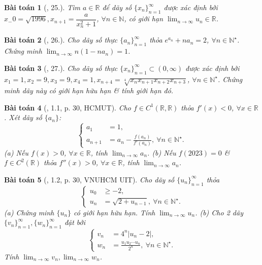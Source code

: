 \documentclass{article}
\newtheorem{baitoan}{Bài toán}
\begin{document}
\begin{baitoan}[\cite{TLCT_dai_so_giai_tich_11}, 25.]
	Tìm $a\in\mathbb{R}$ để dãy số $\{x_n\}_{n=1}^\infty$ được xác định bởi $x_-0 = \sqrt{1996},x_{n+1} = \dfrac{a}{x_n^2 + 1}$, $\forall n\in\mathbb{N}$, có giới hạn $\lim_{n\to\infty} u_n\in\mathbb{R}$.
\end{baitoan}

\begin{baitoan}[\cite{TLCT_dai_so_giai_tich_11}, 26.]
	Cho dãy số thực $\{a_n\}_{n=1}^\infty$ thỏa $e^{a_n} + na_n = 2$, $\forall n\in\mathbb{N}^\star$. Chứng minh $\lim_{n\to\infty} n(1 - na_n) = 1$.
\end{baitoan}

\begin{baitoan}[\cite{TLCT_dai_so_giai_tich_11}, 27.]
	Cho dãy số thực $\{x_n\}_{n=1}^\infty\subset(0,\infty)$ được xác định bởi $x_1 = 1,x_2 = 9,x_3 = 9,x_4 = 1,x_{n+4} = \sqrt[4]{x_nx_{n+1}x_{n+2}x_{n+3}}$, $\forall n\in\mathbb{N}^\star$. Chứng minh dãy này có giới hạn hữu hạn \& tính giới hạn đó.
\end{baitoan}

\begin{baitoan}[\cite{VMS_VMC2023}, 1.1, p. 30, HCMUT]
	Cho $f\in C^1(\mathbb{R},\mathbb{R})$ thỏa $f'(x) < 0$, $\forall x\in\mathbb{R}$. Xét dãy số $\{a_n\}$:
	\begin{equation*}
		\left\{\begin{split}
			a_1 &= 1,\\
			a_{n+1} &= a_n - \frac{f(a_n)}{f'(a_n)},\ \forall n\in\mathbb{N}^\star.
		\end{split}\right.
	\end{equation*}
	(a) Nếu $f(x) > 0$, $\forall x\in\mathbb{R}$, tính $\lim_{n\to\infty} a_n$. (b) Nếu $f(2023) = 0$ \& $f\in C^2(\mathbb{R})$ thỏa $f''(x) > 0$, $\forall x\in\mathbb{R}$, tính $\lim_{n\to\infty} a_n$.
\end{baitoan}

\begin{baitoan}[\cite{VMS_VMC2023}, 1.2, p. 30, VNUHCM UIT]
	Cho dãy số $\{u_n\}_{n=1}^\infty$ thỏa
	\begin{equation*}
		\left\{\begin{split}
			u_0&\ge-2,\\
			u_n &= \sqrt{2 + u_{n-1}},\ \forall n\in\mathbb{N}^\star.
		\end{split}\right.
	\end{equation*}
	(a) Chứng minh $\{u_n\}$ có giới hạn hữu hạn. Tính $\lim_{n\to\infty} u_n$. (b) Cho 2 dãy $\{v_n\}_{n=1}^\infty,\{w_n\}_{n=1}^\infty$ đặt bởi
	\begin{equation*}
		\left\{\begin{split}
			v_n &= 4^n|u_n - 2|,\\
			w_n &= \frac{u_1u_2\cdots u_n}{2^n},\ \forall n\in\mathbb{N}^\star.
		\end{split}\right.
	\end{equation*}
	Tính $\lim_{n\to\infty} v_n,\lim_{n\to\infty} w_n$.
\end{baitoan}
\end{document}
